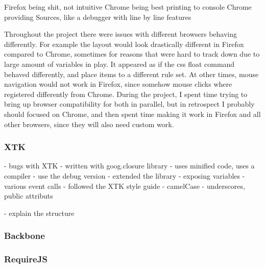 \documentclass[a4paper,11pt,titlepage]{article}
\begin{document}
Firefox being shit, not intuitive
Chrome being best
printing to console
Chrome providing Sources, like a debugger with line by line features

Throughout the project there were issues with different browsers behaving differently. For example the layout would look drastically different in Firefox compared to Chrome, sometimes for reasons that were hard to track down due to large amount of variables in play. It appeared as if the css float command behaved differently, and place items to a different rule set. At other times, mouse navigation would not work in Firefox, since somehow mouse clicks where registered differently from Chrome. During the project, I spent time trying to bring up browser compatibility for both in parallel, but in retrospect I probably should focused on Chrome, and then spent time making it work in Firefox and all other browsers, since they will also need custom work.



\subsubsection{XTK}

- bugs with XTK
- written with goog.closure library
	- uses minified code, uses a compiler
	- use the debug version
- extended the library
- exposing variables
- various event calls
- followed the XTK style guide
	- camelCase
	- underscores, public attributs

- explain the structure




\subsubsection{Backbone}



\subsubsection{RequireJS}
\end{document}
